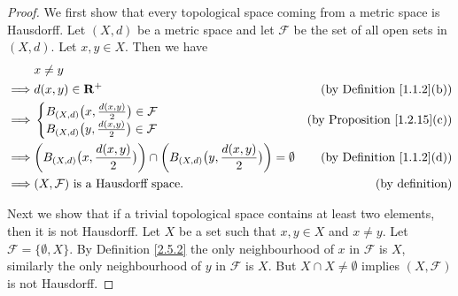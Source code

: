 \begin{proof}
    We first show that every topological space coming from a metric space is Hausdorff.
    Let \((X, d)\) be a metric space and let \(\mathcal{F}\) be the set of all open sets in \((X, d)\).
    Let \(x, y \in X\).
    Then we have
    \begin{align*}
                 & x \neq y                                                                                                                                                             \\
        \implies & d(x, y) \in \mathbf{R}^+                                                                                                   & \text{(by Definition \ref{1.1.2}(b))}   \\
        \implies & \begin{cases}
            B_{(X, d)}\big(x, \frac{d(x, y)}{2}\big) \in \mathcal{F} \\
            B_{(X, d)}\big(y, \frac{d(x, y)}{2}\big) \in \mathcal{F}
        \end{cases}                                                                                                 & \text{(by Proposition \ref{1.2.15}(c))} \\
        \implies & \bigg(B_{(X, d)}\big(x, \frac{d(x, y)}{2}\big)\bigg) \cap \bigg(B_{(X, d)}\big(y, \frac{d(x, y)}{2}\big)\bigg) = \emptyset & \text{(by Definition \ref{1.1.2}(d))}   \\
        \implies & (X, \mathcal{F}) \text{ is a Hausdorff space}.                                                                             & \text{(by definition)}
    \end{align*}

    Next we show that if a trivial topological space contains at least two elements, then it is not Hausdorff.
    Let \(X\) be a set such that \(x, y \in X\) and \(x \neq y\).
    Let \(\mathcal{F} = \{\emptyset, X\}\).
    By Definition \ref{2.5.2} the only neighbourhood of \(x\) in \(\mathcal{F}\) is \(X\), similarly the only neighbourhood of \(y\) in \(\mathcal{F}\) is \(X\).
    But \(X \cap X \neq \emptyset\) implies \((X, \mathcal{F})\) is not Hausdorff.


\end{proof}
